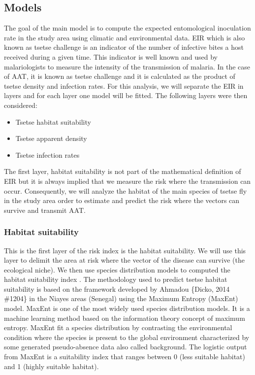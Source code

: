 \documentclass[10pt]{article}
\begin{document}
\subsection*{Models}
\label{unnumbered-8}
The goal of the main model is to compute the expected entomological inoculation rate in the study area using climatic and environmental data.
EIR which is also known as tsetse challenge is an indicator of the number of infective bites a host received during a given time. This indicator is well known and used by malariologists to measure the intensity of the transmission of malaria.  In the case of AAT, it is known as tsetse challenge and it is calculated as the product of tsetse density and infection rates.
For this analysis, we will separate the EIR in layers and for each layer one model will be fitted.
The following layers were then considered:
\begin{itemize}
\item Tsetse habitat suitability
\item Tsetse apparent density
\item Tsetse infection rates
\end{itemize}
The first layer, habitat suitability is not part of the mathematical definition of EIR but it is always implied that we measure the risk where the transmission can occur. Consequently, we will analyze  the habitat of the main species of tsetse fly in the study area order to estimate and predict the risk where the vectors can survive and transmit AAT.

\subsubsection*{Habitat suitability}
\label{unnumbered-9}
This is the first layer of the risk index is the habitat suitability. 
We will use this layer to delimit the area at risk where the vector of the disease can survive (the ecological niche).
We then use species distribution models to computed the habitat suitability index . The methodology used to predict tsetse habitat suitability is based on the framework developed by Ahmadou \{Dicko, 2014 \#1204\} in the Niayes areas (Senegal) using the Maximum Entropy (MaxEnt) model.
MaxEnt is one of the most widely used species distribution models. It is a machine learning method based on the information theory concept of maximum entropy.  MaxEnt fit a species distribution by contrasting the environmental condition where the species is present to the global environment characterized by some generated pseudo-absence data also called background.
The logistic output from MaxEnt is a suitability index that ranges between 0 (less suitable habitat) and 1 (highly suitable habitat).
\end{document}
